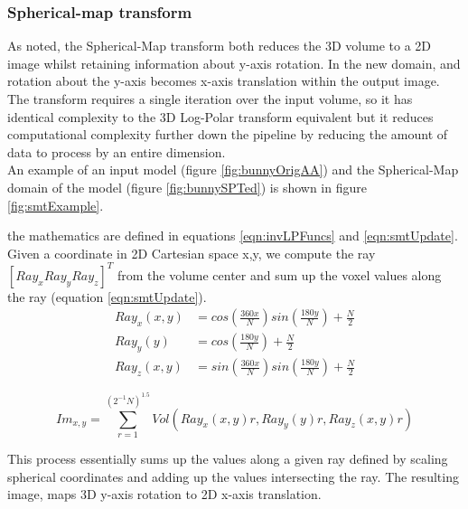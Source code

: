 \subsubsection{Spherical-map transform}
\label{SMTransform}

As noted, the Spherical-Map transform both reduces the 3D volume to a 2D image whilst retaining information about y-axis rotation. In the new domain, and rotation about the y-axis becomes x-axis translation within the output image. The transform requires a single iteration over the input volume, so it has identical complexity to the 3D Log-Polar transform equivalent but it reduces computational complexity further down the pipeline by reducing the amount of data to process by an entire dimension. \\

An example of an input model (figure \ref{fig:bunnyOrigAA}) and the Spherical-Map domain of the model (figure \ref{fig:bunnySPTed}) is shown in figure \ref{fig:smtExample}.

 the mathematics are defined in equations \ref{eqn:invLPFuncs} and \ref{eqn:smtUpdate}. Given a coordinate in 2D Cartesian space x,y, we compute the ray $[Ray_x Ray_y Ray_z]^T$ from the volume center and sum up the voxel values along the ray (equation \ref{eqn:smtUpdate}). \\


\begin{equation} \label{eqn:invLPFuncs}
\begin{split}
Ray_x(x,y) & = cos\left(\frac{360x}{N}\right)sin\left(\frac{180y}{N}\right)  + \frac{N}{2} \\
Ray_y(y) & = cos\left(\frac{180y}{N}\right) + \frac{N}{2} \\
Ray_z(x,y) & = 	sin\left(\frac{360x}{N}\right)sin\left(\frac{180y}{N}\right) + \frac{N}{2}
\end{split}
\end{equation}

\begin{equation} \label{eqn:smtUpdate}
Im_{x,y} = \sum_{r=1}^{(2^{-1}N)^{1.5}}{Vol(Ray_x(x,y)r, Ray_y(y)r, Ray_z(x,y)r)} 
\end{equation}

This process essentially sums up the values along a given ray defined by scaling spherical coordinates and adding up the values intersecting the ray. The resulting image, maps 3D y-axis rotation to 2D x-axis translation.  \\

